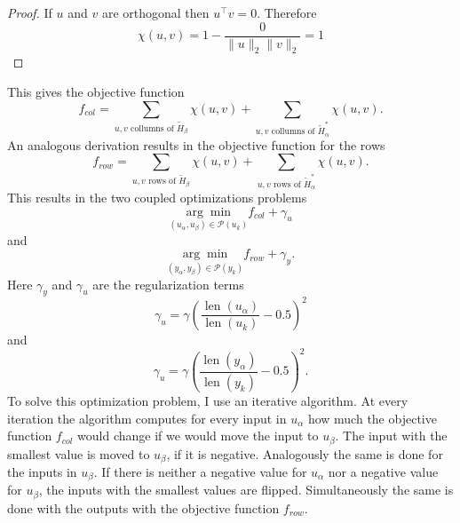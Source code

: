 \documentclass[doctype=mastersthesis,BCOR=15mm,biblatex]{ldvbook}%
\DeclareMathOperator{\length}{len}
\newcommand{\partition}{\mathcal{P}}
\begin{document}
\begin{proof}
	If $u$ and $v$ are orthogonal then $u^\top v =0$. Therefore
	\begin{equation}
	\chi(u,v) = 1-\frac{0}{\|u\|_2\|v\|_2}= 1
	\end{equation}
\end{proof}
This gives the objective function
\begin{equation}
f_{col} = \sum_{u,v \text{ collumns of }  \tilde{H}_\beta}\!\!\!\!\!\!\chi(u,v)
+\sum_{u,v \text{ collumns of } \tilde{H}_\alpha^*}\!\!\!\!\!\!\chi(u,v)
.
\end{equation}
An analogous derivation results in the objective function for the rows
\begin{equation}
f_{row} = \sum_{u,v \text{ rows of }  \tilde{H}_\beta}\!\!\!\chi(u,v)
+\sum_{u,v \text{ rows of }  \tilde{H}_\alpha^*}\!\!\!\chi(u,v)
.
\end{equation}
This results in the two coupled optimizations problems
\begin{equation}
\underset{(u_\alpha, u_\beta) \in \partition(u_k)}{\arg\min} f_{col} + \gamma_u
\end{equation}
and 
\begin{equation}
\underset{(y_\alpha, y_\beta) \in \partition(y_k)}{\arg\min} f_{row} + \gamma_y
.
\end{equation}
Here $\gamma_y$ and $\gamma_u$ are the regularization terms
\begin{equation}
\gamma_u =\gamma
\left(\frac{\length(u_\alpha)}{\length(u_k)}-0.5\right)^2
\end{equation}
and
\begin{equation}
\gamma_u =\gamma 
\left(\frac{\length(y_\alpha)}{\length(y_k)}-0.5\right)^2
.
\end{equation}
To solve this optimization problem, I use an iterative algorithm.
At every iteration the algorithm computes for every input in $u_\alpha$ how much the objective function $f_{col}$ would change if we would move the input to $u_\beta$.
The input with the smallest value is moved to $u_\beta$, if it is negative.
Analogously the same is done for the inputs in $u_\beta$.
If there is neither a negative value for  $u_\alpha$ nor a negative value for $u_\beta$, the inputs with the smallest values are flipped.
Simultaneously the same is done with the outputs with the objective function $f_{row}$.
\end{document}
